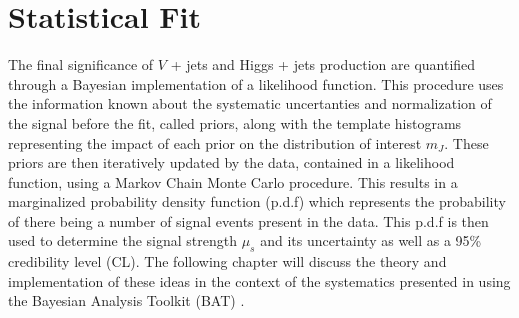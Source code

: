 \chapter{Statistical Fit} \label{chap:fit}

The final significance of $V$ + jets and Higgs + jets production are quantified
through a Bayesian implementation of a likelihood function.  This procedure
uses the information known about the systematic uncertanties and normalization
of the signal before the fit, called priors, along with the template histograms
representing the impact of each prior on the distribution of interest $m_{J}$.
These priors are then iteratively updated by the data, contained in a
likelihood function, using a Markov Chain Monte Carlo procedure.  This results
in a marginalized probability density function (p.d.f) which represents the
probability of there being a number of signal events present in the data.  This
p.d.f is then used to determine the signal strength $\mu_{s}$ and its
uncertainty as well as a 95\% credibility level (CL).  The following chapter
will discuss the theory and implementation of these ideas in the context of the
systematics presented in  using the Bayesian Analysis
Toolkit (BAT) \cite{Beaujean:2011zz}.




